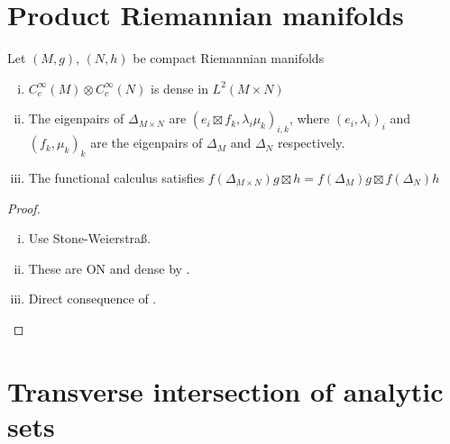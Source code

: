 
\begin{appendix}

\section{Product Riemannian manifolds}%
\label{sec:product_riemannian_manifolds}

\begin{lem} \label{thm:prodRM}
	Let $(M, g)$, $(N, h)$ be compact Riemannian manifolds

	\begin{enumerate}[(i)]
		\item \label{it:dense}
			$C^\infty_c(M) ⊗ C_c^\infty(N)$ is dense in $L^2(M \times N)$
		\item \label{it:eigen}
			The eigenpairs of $Δ_{M \times N}$ are $(e_i \boxtimes f_k, λ_i μ_k)_{i,k}$, where $(e_i, λ_i)_i$ and $(f_k, μ_k)_k$ are the eigenpairs of $Δ_M$ and $Δ_N$ respectively.
		\item The functional calculus satisfies $f(Δ_{M \times N}) g \boxtimes h = f(Δ_M) g \boxtimes f(Δ_N) h$
	\end{enumerate}
	\begin{proof}
		\begin{enumerate}[(i)]
			\item Use Stone-Weierstraß.
			\item These are ON and dense by .
			\item Direct consequence of .
		\end{enumerate}
	\end{proof}
\end{lem}

\section{Transverse intersection of analytic sets}%
\label{sec:transverse_intersection_of_analytic_sets}


\end{appendix}
